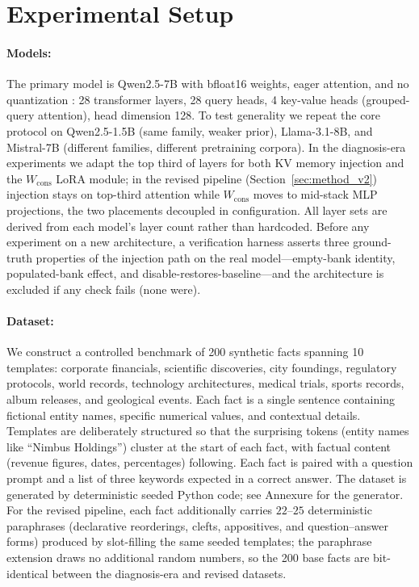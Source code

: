 
\section{Experimental Setup}
\label{sec:setup}

\paragraph{Models:}
The primary model is Qwen2.5-7B with bfloat16 weights, eager attention, and no quantization \citep{qwen2024}: 28 transformer layers, 28 query heads, 4 key-value heads (grouped-query attention), head dimension 128. To test generality we repeat the core protocol on Qwen2.5-1.5B (same family, weaker prior), Llama-3.1-8B, and Mistral-7B (different families, different pretraining corpora). In the diagnosis-era experiments we adapt the top third of layers for both KV memory injection and the $W_{\mathrm{cons}}$ LoRA module; in the revised pipeline (Section~\ref{sec:method_v2}) injection stays on top-third attention while $W_{\mathrm{cons}}$ moves to mid-stack MLP projections, the two placements decoupled in configuration. All layer sets are derived from each model's layer count rather than hardcoded. Before any experiment on a new architecture, a verification harness asserts three ground-truth properties of the injection path on the real model---empty-bank identity, populated-bank effect, and disable-restores-baseline---and the architecture is excluded if any check fails (none were).

\paragraph{Dataset:}
We construct a controlled benchmark of 200 synthetic facts spanning 10 templates: corporate financials, scientific discoveries, city foundings, regulatory protocols, world records, technology architectures, medical trials, sports records, album releases, and geological events. Each fact is a single sentence containing fictional entity names, specific numerical values, and contextual details. Templates are deliberately structured so that the surprising tokens (entity names like ``Nimbus Holdings'') cluster at the start of each fact, with factual content (revenue figures, dates, percentages) following. Each fact is paired with a question prompt and a list of three keywords expected in a correct answer. The dataset is generated by deterministic seeded Python code; see Annexure for the generator. For the revised pipeline, each fact additionally carries $22$--$25$ deterministic paraphrases (declarative reorderings, clefts, appositives, and question--answer forms) produced by slot-filling the same seeded templates; the paraphrase extension draws no additional random numbers, so the 200 base facts are bit-identical between the diagnosis-era and revised datasets.

